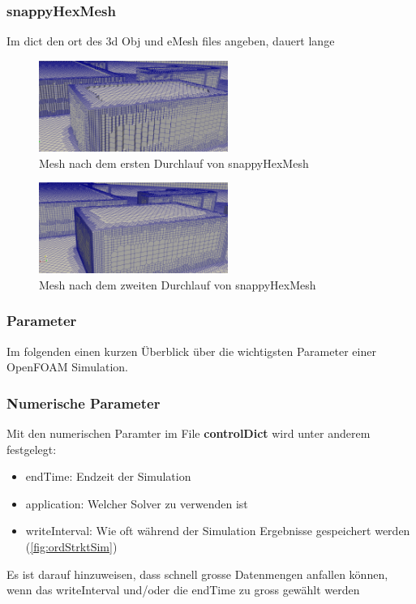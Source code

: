 \subsubsection{snappyHexMesh\label{openfoam:section:snappyHexMesh}}
Im dict den ort des 3d Obj und eMesh files angeben, dauert lange

\begin{figure}
    \centering
    \includegraphics[width=0.55\textwidth]{papers/openfoam/Bilder/Snappy_grob.png}
    \caption{Mesh nach dem ersten Durchlauf von snappyHexMesh}
    \label{fig:snappygrobbild}
\end{figure}

\begin{figure}
    \centering
    \includegraphics[width=0.55\textwidth]{papers/openfoam/Bilder/Snappy_fein.png}
    \caption{Mesh nach dem zweiten Durchlauf von snappyHexMesh}
    \label{fig:snappyfeinbild}
\end{figure}
\subsubsection{Parameter\label{openfoam:section:Parameter}}
Im folgenden einen kurzen Überblick über die wichtigsten Parameter einer OpenFOAM Simulation.

\subsubsection{Numerische Parameter\label{openfoam:section:Numerische Parameter}}
Mit den numerischen Paramter im File \textbf{controlDict} wird unter anderem festgelegt:
\begin{itemize}
    \item endTime: Endzeit der Simulation
    \item application: Welcher Solver zu verwenden ist
    \item writeInterval: Wie oft während der Simulation Ergebnisse gespeichert werden (\ref{fig:ordStrktSim})
\end{itemize}
Es ist darauf hinzuweisen, dass schnell grosse Datenmengen anfallen können, wenn das writeInterval und/oder die endTime zu gross gewählt werden

